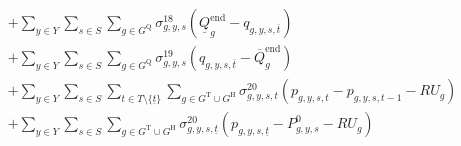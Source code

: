 \documentclass{article}
\newcommand{\sGeneratorsThermal}{G^{\mathrm{T}}}
\newcommand{\sGeneratorsHydro}{G^{\mathrm{H}}}
\newcommand{\sStorage}{G^{\mathrm{Q}}}
\newcommand{\sYears}{Y}
\newcommand{\sScenarios}{S}
\newcommand{\sIntervals}{T}
\newcommand{\iGenerator}{g}
\newcommand{\iYear}{y}
\newcommand{\iScenario}{s}
\newcommand{\iInterval}{t}
\newcommand{\iIntervalTerminal}{\overline{\iInterval}}
\newcommand{\iIntervalStart}{\underline{\iInterval}}
\newcommand{\cRampRateUp}[1][\iGenerator]{RU_{#1}}
\newcommand{\cStorageUnitEnergyIntervalEndMax}[1][\iGenerator]{\overline{Q}^{\mathrm{end}}_{#1}}
\newcommand{\cStorageUnitEnergyIntervalEndMin}[1][\iGenerator]{\underline{Q}^{\mathrm{end}}_{#1}}
\newcommand{\cPowerInitial}[1][\iGenerator,\iYear,\iScenario]{P_{#1}^{0}}
\newcommand{\cPowerOutInitial}[1][\iGenerator,\iYear,\iScenario]{\hat{P}_{#1}^{\mathrm{out}}}
\newcommand{\cPowerInInitial}[1][\iGenerator,\iYear,\iScenario]{\hat{P}_{#1}^{\mathrm{in}}}
\newcommand{\vPower}[1][\iGenerator,\iYear,\iScenario,\iInterval]{p_{#1}}
\newcommand{\vPowerIn}[1][\iGenerator,\iYear,\iScenario,\iInterval]{p^{\mathrm{in}}_{#1}}
\newcommand{\vPowerOut}[1][\iGenerator,\iYear,\iScenario,\iInterval]{p^{\mathrm{out}}_{#1}}
\newcommand{\vStorageUnitEnergy}[1][\iGenerator,\iYear,\iScenario,\iInterval]{q_{#1}}
\newcommand{\dMinStorageEnergyIntervalEnd}[1][\iGenerator,\iYear,\iScenario]{\sigma_{#1}^{18}}
\newcommand{\dMaxStorageEnergyIntervalEnd}[1][\iGenerator,\iYear,\iScenario]{\sigma_{#1}^{19}}
\newcommand{\dRampRateUp}[1][\iGenerator,\iYear,\iScenario,\iInterval]{\sigma_{#1}^{20}}
\newcommand{\dRampRateUpStorageCharging}[1][\iGenerator,\iYear,\iScenario,\iInterval]{\sigma_{#1}^{21}}
\newcommand{\dRampRateUpStorageDischarging}[1][\iGenerator,\iYear,\iScenario,\iInterval]{\sigma_{#1}^{22}}
\begin{document}
\begin{align}
		& + \sum\limits_{\iYear \in \sYears}\sum\limits_{\iScenario \in \sScenarios} \sum\limits_{\iGenerator \in \sStorage} \dMinStorageEnergyIntervalEnd \left(\cStorageUnitEnergyIntervalEndMin - \vStorageUnitEnergy[\iGenerator,\iYear,\iScenario,\iIntervalTerminal]\right)\\
		& + \sum\limits_{\iYear \in \sYears}\sum\limits_{\iScenario \in \sScenarios} \sum\limits_{\iGenerator \in \sStorage} \dMaxStorageEnergyIntervalEnd \left(\vStorageUnitEnergy[\iGenerator,\iYear,\iScenario,\iIntervalTerminal] - \cStorageUnitEnergyIntervalEndMax\right)\\
		& + \sum\limits_{\iYear \in \sYears}\sum\limits_{\iScenario \in \sScenarios}\sum\limits_{\iInterval \in \sIntervals \setminus \{\iIntervalStart\}} \sum\limits_{\iGenerator \in \sGeneratorsThermal \cup \sGeneratorsHydro} \dRampRateUp \left(\vPower - \vPower[\iGenerator,\iYear,\iScenario,\iInterval-1] - \cRampRateUp\right)\\
		& + \sum\limits_{\iYear \in \sYears}\sum\limits_{\iScenario \in \sScenarios} \sum\limits_{\iGenerator \in \sGeneratorsThermal \cup \sGeneratorsHydro} \dRampRateUp[\iGenerator,\iYear,\iScenario,\iIntervalStart] \left(\vPower[\iGenerator,\iYear,\iScenario,\iIntervalStart] - \cPowerInitial - \cRampRateUp\right)\\

\end{align}
\end{document}
